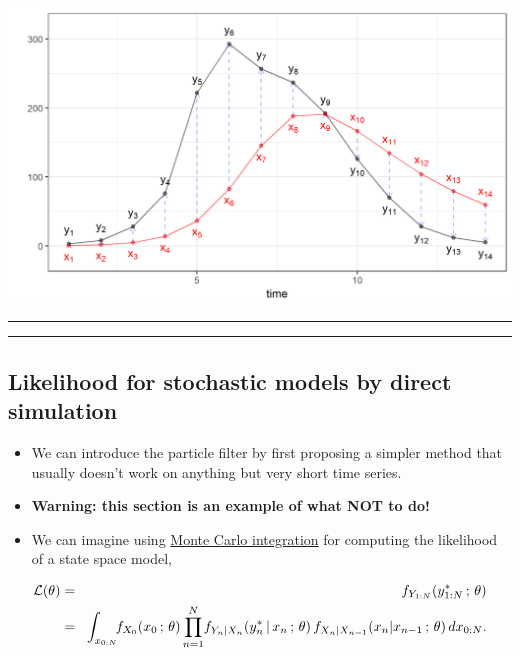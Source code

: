 \documentclass[]{article}
\begin{document}
\begin{center}\includegraphics{figure/notes12-det-example-1} \end{center}

\begin{center}\rule{0.5\linewidth}{\linethickness}\end{center}

\begin{center}\rule{0.5\linewidth}{\linethickness}\end{center}

\subsection{Likelihood for stochastic models by direct
simulation}\label{likelihood-for-stochastic-models-by-direct-simulation}

\begin{itemize}
\item
  We can introduce the particle filter by first proposing a simpler
  method that usually doesn't work on anything but very short time
  series.
\item
  \textbf{Warning: this section is an example of what NOT to do!}
\item
  We can imagine using
  \href{./monteCarlo.html\#monte-carlo-integration}{Monte Carlo
  integration} for computing the likelihood of a state space model,
\end{itemize}

\begin{eqnarray}
\mathcal{L}(\theta)
&=&
f_{Y_{1:N}}(y_{1:N}^*\, ; \,\theta)
\\
&=& \! \int_{x_{0:N}} \!\! f_{X_0}(x_0\, ; \,\theta)\prod_{n=1}^{N}\!f_{Y_n|X_n}(y_n^*{\, | \,} x_n\, ; \, \theta)\, f_{X_n|X_{n-1}}(x_n|x_{n-1}\, ; \,\theta)\, dx_{0:N}.
\end{eqnarray}
\end{document}
